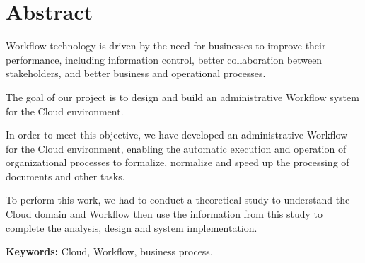 \chapter*{Abstract}
\large
Workflow technology is driven by the need for businesses to improve their performance, including information control, better collaboration between stakeholders, and better business and operational processes.

The goal of our project is to design and build an administrative Workflow system for the Cloud environment.


In order to meet this objective, we have developed an administrative Workflow for the Cloud environment, enabling the automatic execution and operation of organizational processes to formalize, normalize and speed up the processing of documents and other tasks.

To perform this work, we had to conduct a theoretical study to understand the Cloud domain and Workflow then use the information from this study to complete the analysis, design and system implementation.


\textbf{Keywords:} Cloud, Workflow, business process.
 
 \normalsize